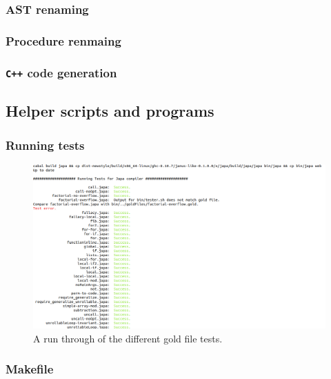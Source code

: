 \subsubsection{AST renaming}


\subsubsection{Procedure renmaing}


\subsubsection{\texttt{C++} code generation}


\subsection{Helper scripts and programs}

\subsubsection{Running tests}

\begin{figure}[H]
    \centering
    \includegraphics[scale=0.5]{imgs/testrun.png}
    \caption{A run through of the different gold file tests.}
    \label{fig:testrun}
\end{figure}

\subsubsection{Makefile}



